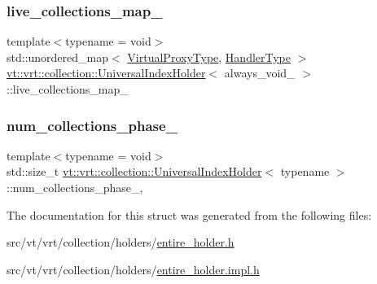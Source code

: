 \mbox{\label{structvt_1_1vrt_1_1collection_1_1_universal_index_holder_a42b948be40223918c12a531e2f7a290e}} 
\subsubsection{\texorpdfstring{live\+\_\+collections\+\_\+map\+\_\+}{live\_collections\_map\_}}
{\footnotesize\ttfamily template$<$typename  = void$>$ \\
std\+::unordered\+\_\+map$<$ \hyperlink{namespacevt_a1b417dd5d684f045bb58a0ede70045ac}{Virtual\+Proxy\+Type}, \hyperlink{namespacevt_af64846b57dfcaf104da3ef6967917573}{Handler\+Type} $>$ \hyperlink{structvt_1_1vrt_1_1collection_1_1_universal_index_holder}{vt\+::vrt\+::collection\+::\+Universal\+Index\+Holder}$<$ always\+\_\+void\+\_\+ $>$\+::live\+\_\+collections\+\_\+map\+\_\+\hspace{0.3cm}{\ttfamily [static]}}

\mbox{\label{structvt_1_1vrt_1_1collection_1_1_universal_index_holder_ab07d976281f76b772732431484120be4}} 
\subsubsection{\texorpdfstring{num\+\_\+collections\+\_\+phase\+\_\+}{num\_collections\_phase\_}}
{\footnotesize\ttfamily template$<$typename  = void$>$ \\
std\+::size\+\_\+t \hyperlink{structvt_1_1vrt_1_1collection_1_1_universal_index_holder}{vt\+::vrt\+::collection\+::\+Universal\+Index\+Holder}$<$ typename $>$\+::num\+\_\+collections\+\_\+phase\+\_\+\hspace{0.3cm}{\ttfamily [static]}, {\ttfamily [private]}}



The documentation for this struct was generated from the following files\+:\begin{DoxyCompactItemize}
\item 
src/vt/vrt/collection/holders/\hyperlink{entire__holder_8h}{entire\+\_\+holder.\+h}\item 
src/vt/vrt/collection/holders/\hyperlink{entire__holder_8impl_8h}{entire\+\_\+holder.\+impl.\+h}\end{DoxyCompactItemize}
